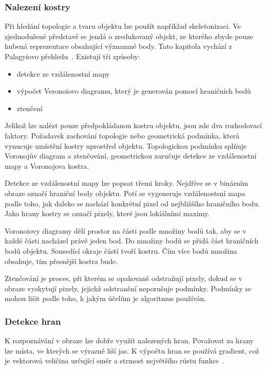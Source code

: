 \subsubsection{Nalezení kostry}
Při hledání topologie a tvaru objektu lze použít například skeletonizaci. Ve zjednodušené představě se jendá o zredukovaný objekt, ze kterého zbyde pouze hubená reprezentace obsahující významné body. Tato kapitola vychází z Palagyiovo přehledu~\cite{25}. Existují tři způsoby:

\begin{itemize}
\item detekce ze vzdálenostní mapy
\item výpočet Veronoiovo diagramu, který je generován pomocí hraničních bodů
\item ztenčení
\end{itemize}

Jelikož lze nalézt pouze předpokládanou kostru objektu, jsou zde dva rozhodovací faktory. Požadavek zachování topologie %
nebo geometrická podmínka, která vynucuje umístění kostry uprostřed objektu. Topologickou podmínku splňuje Voronojův diagram a ztenčování, geometrickou zaručuje detekce ze vzdálenostní mapy a Voronojova kostra.

Detekce ze vzdálenostní mapy lze popsat třemi kroky. Nejdříve se v binárním obraze označí hraniční body objektu. Potí se vygeneruje vzdálenostsní mapa podle toho, jak daleko se nachází konkrétní pixel od nejbližšího hraničního bodu. Jako hrany kostry se označí pixely, které jsou lokíálními maximy.

Voronoiovy diagramy dělí prostor na části podle množiny bodů tak, aby se v každé části nacházel právě jeden bod. Do množiny bodů se přidá část hraničních bodů objektu. Sousedící okraje částí tvoří kostru. Čím více bodů množina obsahuje, tím přesnější kostra bude.

Ztenčování je proces, při kterém se opakovaně odstraňují pixely, dokud se v obraze vyskytují pixely, jejichž odstranění neporušuje podmínky. Podmínky se mohou lišit podle toho, k jakým účelům je algoritmus používán.

\subsubsection{Detekce hran}
K rozpoznávání v obraze lze dobře využít nalezených hran. Považovat za hrany lze místa, ve kterých se výrazně liší jas. K výpočtu hran se používá gradient, což je vektorová veličina určující směr a strmost největšího růstu funkce~\cite{hlav}.


